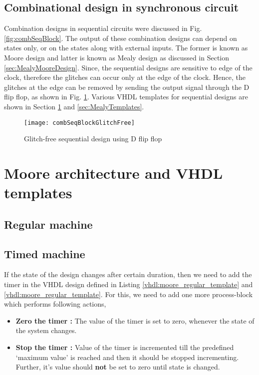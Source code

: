 \subsection{Combinational design in synchronous circuit}\label{sec:glitchInsSync}
Combination designs in sequential circuits were discussed in Fig. \ref{fig:combSeqBlock}. The output of these combination designs can depend on states only, or on the states along with external inputs. The former is known as Moore design and latter is known as Mealy design as discussed in Section \ref{sec:MealyMooreDesign}. Since, the sequential designs are sensitive to edge of the clock, therefore the glitches can occur only at the edge of the clock. Hence, the glitches at the edge can be removed by sending the output signal through the D flip flop, as shown in Fig. \ref{fig:combSeqBlockGlitchFree}. Various VHDL templates for sequential designs are shown in Section \ref{sec:MooreTemplates} and \ref{sec:MealyTemplates}. 

\begin{figure}[!h]
	\centering
	\texttt{[image: combSeqBlockGlitchFree]}
	\caption{Glitch-free sequential design using D flip flop}
	\label{fig:combSeqBlockGlitchFree}
\end{figure}


\section{Moore architecture and VHDL templates} \label{sec:MooreTemplates}
\subsection{Regular machine}




\subsection{Timed machine}
If the state of the design changes after certain duration, then we need to add the timer in the VHDL design defined in Listing \ref{vhdl:moore_regular_template} and \ref{vhdl:moore_regular_template}. For this, we need to add one more process-block which performs following actions, 
\begin{itemize}
	\item \textbf{Zero the timer : } The value of the timer is set to zero, whenever the state of the system changes. 
	\item \textbf{Stop the timer : } Value of the timer is incremented till the predefined `maximum value' is reached and then it should be stopped incrementing. Further, it's value should \textbf{not} be set to zero until state is changed. 
\end{itemize}

